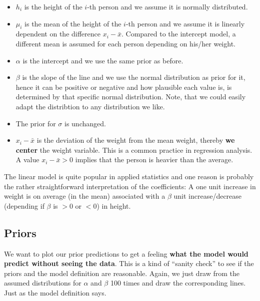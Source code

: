 \documentclass[
]{book}
\providecommand{\tightlist}{%
  \setlength{\itemsep}{0pt}\setlength{\parskip}{0pt}}
\begin{document}
\begin{itemize}
\tightlist
\item
  \(h_i\) is the height of the \(i\)-th person and we assume it is normally distributed.
\item
  \(\mu_i\) is the mean of the height of the \(i\)-th person and we
  assume it is linearly dependent on the difference \(x_i-\bar{x}\).
  Compared to the intercept model, a different mean is assumed for each person
  depending on his/her weight.
\item
  \(\alpha\) is the intercept and we use the same prior as before.
\item
  \(\beta\) is the slope of the line and we use the normal distribution as prior for it,
  hence it can be positive or negative and how plausible each value is, is
  determined by that specific normal distribution. Note, that we could
  easily adapt the distribtion to any distribution we like.
\item
  The prior for \(\sigma\) is unchanged.
\item
  \(x_i - \bar{x}\) is the deviation of the weight from the mean weight, thereby \textbf{we
  center} the weight variable. This is a common practice in regression analysis.
  A value \(x_i - \bar{x} > 0\) implies that the person is heavier than the average.
\end{itemize}

The linear model is quite popular in applied statistics and one
reason is probably the rather straightforward interpretation of the coefficients:
A one unit increase in weight is on average (in the mean) associated with
a \(\beta\) unit increase/decrease (depending if \(\beta\) is \(>0\) or \(<0\)) in height.

\subsection{Priors}\label{priors}

We want to plot our prior predictions to get a feeling \textbf{what
the model would predict without seeing the data}.
This is a kind of ``sanity check'' to see if the priors and
the model definition are reasonable.
Again, we just draw from the assumed distributions for \(\alpha\) and \(\beta\)
100 times and draw the corresponding lines. Just as the model
definition says.
\end{document}
